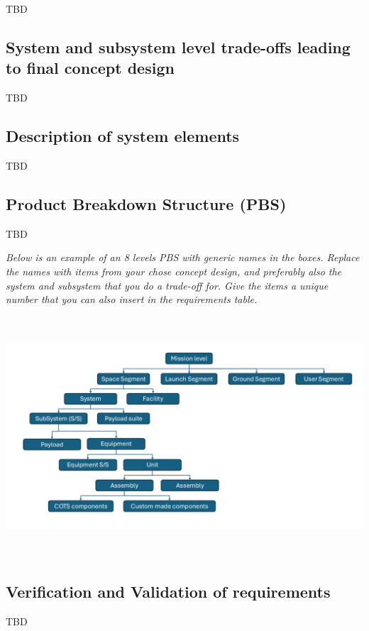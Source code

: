 \documentclass[../main.tex]{subfiles}
\begin{document}
TBD

\subsection{System and subsystem level trade-offs leading to final
concept
design}\label{trade-offs}

TBD

\subsection{Description of system
elements}\label{description-of-system-elements}

TBD

\subsection{Product Breakdown Structure
(PBS)}\label{pbs}

TBD

\emph{Below is an example of an 8 levels PBS with generic names in the
boxes. Replace the names with items from your chose concept design, and
preferably also the system and subsystem that you do a trade-off for.
Give the items a unique number that you can also insert in the
requirements table.}

\includegraphics[width=6.28264in,height=3.53403in]{media/Product Breakdown Structure.png}

\subsection{Verification and Validation of
requirements}\label{verification-and-validation}

TBD
\end{document}
